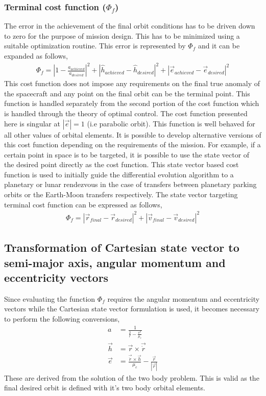 \subsubsection{Terminal cost function ($\Phi_f$)}
The error in the achievement of the final orbit conditions has to be driven down to zero for the purpose of mission design. This has to be minimized using a suitable optimization routine. This error is represented by $\Phi_f$ and it can be expanded as follows,
\begin{align}
	\Phi_f=|1-\frac{a_{achieved}}{a_{desired}}|^2+|\hat{h}_{achieved}-\hat{h}_{desired}|^2+|\vec{e}_{achieved}-\vec{e}_{desired}|^2
\end{align}
This cost function does not impose any requirements on the final true anomaly of the spacecraft and any point on the final orbit can be the terminal point. 
This function is handled separately from the second portion of the cost function which is handled through the theory of optimal control. The cost function presented here is singular at $|\vec{e}|=1$ (i.e parabolic orbit). This function is well behaved for all other values of orbital elements. It is possible to develop alternative versions of this cost function depending on the requirements of the mission. For example, if a certain point in space is to be targeted, it is possible to use the state vector of the desired point directly as the cost function. This state vector based cost function is used to initially guide the differential evolution algorithm to a planetary or lunar rendezvous in the case of transfers between planetary parking orbits or the Earth-Moon transfers respectively. The state vector targeting terminal cost function can be expressed as follows,
\begin{align}
	\Phi_f=|\vec{r}_{final}-\vec{r}_{desired}|^2+|\vec{v}_{final}-\vec{v}_{desired}|^2
\end{align}
\subsection{Transformation of Cartesian state vector to semi-major axis, angular momentum and eccentricity vectors}
Since evaluating the function $\Phi_f$ requires the angular momentum and eccentricity vectors while the Cartesian state vector formulation is used, it becomes necessary to perform the following conversions,
\begin{align}
	a&=\frac{1}{\frac{2}{r}-\frac{v^2}{\mu_c}}\\
	\vec{h}&=\vec{r}\times\vec{\dot{r}}\\
	\vec{e}&=\frac{\vec{\dot{r}}\times\vec{h}}{\mu_c}-\frac{\vec{r}}{|\vec{r}|}
\end{align}
These are derived from the solution of the two body problem. This is valid as the final desired orbit is defined with it's two body orbital elements.
